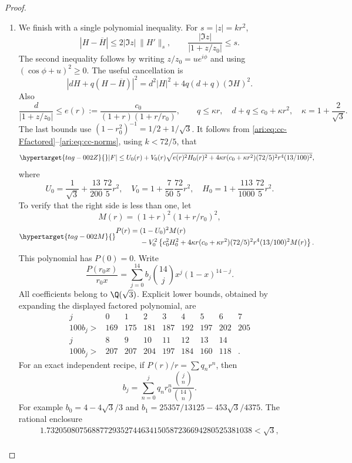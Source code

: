\begin{proof}
\begin{enumerate}[label=\arabic*.,leftmargin=*]
\item We finish with a single polynomial inequality. For $s=|z|=kr^2$,
\[
 |H-\overline H|\le2|\Im z|\,\|H'\|_s,\qquad
 \frac{|\Im z|}{|1+z/z_0|}\le s.
\]
The second inequality follows by writing $z/z_0=ue^{i\phi}$
and using $(\cos\phi+u)^2\ge0$. The useful cancellation is
\[
 |dH+q(H-\overline H)|^2
      =d^2|H|^2+4q(d+q)(\Im H)^2.
\]
Also
\[
 \frac d{|1+z/z_0|}\le
 e(r):=\frac{c_0}{(1+r)(1+r/r_0)},\qquad
 q\le\kappa r,\quad d+q\le c_0+\kappa r^2,
 \quad\kappa=1+\frac2{\sqrt3}.
\]
The last bounds use $(1-r_0^2)^{-1}=1/2+1/\sqrt3$.
It follows from \eqref{ari:eq:cc-Ffactored}--\eqref{ari:eq:cc-norms},
using $k<72/5$, that
\begin{equation}\hypertarget{tag-002Z}{}\label{ari:eq:cc-scalar}
 |F|\le U_0(r)+V_0(r)
 \sqrt{e(r)^2H_0(r)^2+
       4\kappa r(c_0+\kappa r^2)(72/5)^2r^4(13/100)^2},
\end{equation}
where
\[
 U_0=\frac1{\sqrt3}+\frac{13}{200}\frac{72}{5}r^2,
 \quad V_0=1+\frac7{50}\frac{72}{5}r^2,
 \quad H_0=1+\frac{113}{1000}\frac{72}{5}r^2.
\]
To verify that the right side is less than one, let
\[
 M(r)=(1+r)^2(1+r/r_0)^2,
\]
\begin{equation}\hypertarget{tag-002M}{}\label{ari:eq:cc-P}
 \begin{aligned}
 P(r)={}&(1-U_0)^2M(r)\\
 &-V_0^2\left\{c_0^2H_0^2+
 4\kappa r(c_0+\kappa r^2)(72/5)^2r^4(13/100)^2M(r)\right\}.
 \end{aligned}
\end{equation}
This polynomial has $P(0)=0$. Write
\[
 \frac{P(r_0x)}{r_0x}
     =\sum_{j=0}^{14}b_j\binom{14}{j}x^j(1-x)^{14-j}.
\]
All coefficients belong to $\Q(\sqrt3)$. Explicit lower bounds,
obtained by expanding the displayed factored polynomial, are
\[
 \begin{array}{c|rrrrrrrr}
 j&0&1&2&3&4&5&6&7\\ \hline
 100b_j>&169&175&181&187&192&197&202&205\\[2pt]
 j&8&9&10&11&12&13&14&\\ \hline
 100b_j>&207&207&204&197&184&160&118&.
 \end{array}
\]
For an exact independent recipe, if $P(r)/r=\sum q_nr^n$,
then
\[
 b_j=\sum_{n=0}^j q_nr_0^n
                  \frac{\binom jn}{\binom{14}n}.
\]
For example $b_0=4-4\sqrt3/3$ and
$b_1=25357/13125-453\sqrt3/4375$. The rational enclosure
\[
 \begin{gathered}
 1.73205080756887729352744634150587236694280525381038<\sqrt3,\\

\end{gathered}\]
\end{enumerate}
\end{proof}
